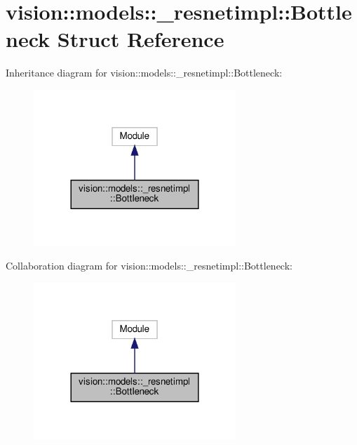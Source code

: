 \hypertarget{structvision_1_1models_1_1__resnetimpl_1_1Bottleneck}{}\section{vision\+:\+:models\+:\+:\+\_\+resnetimpl\+:\+:Bottleneck Struct Reference}
\label{structvision_1_1models_1_1__resnetimpl_1_1Bottleneck}


Inheritance diagram for vision\+:\+:models\+:\+:\+\_\+resnetimpl\+:\+:Bottleneck\+:
\nopagebreak
\begin{figure}[H]
\begin{center}
\leavevmode
\includegraphics[width=216pt]{structvision_1_1models_1_1__resnetimpl_1_1Bottleneck__inherit__graph}
\end{center}
\end{figure}


Collaboration diagram for vision\+:\+:models\+:\+:\+\_\+resnetimpl\+:\+:Bottleneck\+:
\nopagebreak
\begin{figure}[H]
\begin{center}
\leavevmode
\includegraphics[width=216pt]{structvision_1_1models_1_1__resnetimpl_1_1Bottleneck__coll__graph}
\end{center}
\end{figure}
